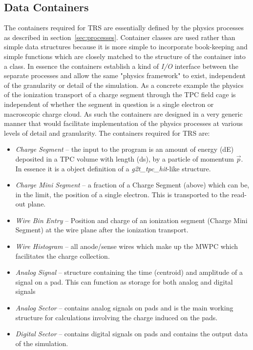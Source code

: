 \documentclass[twoside]{article}
\newcommand{\name}[1]{\textsf{#1}}%
\begin{document}
\subsection{Data Containers}
\label{sec:dataContainers}

The containers required for \name{TRS} are essentially defined by 
the physics processes as described in section~\ref{sec:processes}.  Container
classes are used rather than simple data structures because it is
more simple to incorporate book-keeping and simple functions which
are closely matched to the structure of the container into a class.  
In essence the
containers establish a kind of {\em I/O} interface between the separate
processes and allow the same "physics framework" to exist, independent of
the granularity or detail of the simulation.  As a concrete example the
physics of the ionization transport of a charge segment through the
TPC field cage is independent of whether the segment in question is
a single electron or macroscopic charge cloud.  As such the containers
are designed in a very generic manner that would facilitate implementation
of the physics processes at various levels of detail and granularity.
The containers required for \name{TRS} are:

\begin{itemize}
   \item {\em Charge Segment} -- the input to the program is an amount of
     energy (dE) deposited in a TPC volume with length (ds), by a
     particle of momentum $\vec{p}$.  In essence it is a object definition
     of a {\em g2t\_tpc\_hit}-like structure.
   \item {\em Charge Mini Segment} -- a fraction of a Charge Segment (above) 
     which can be, in the limit, the position of a single electron.
     This is transported to the read-out plane.
   \item {\em Wire Bin Entry} -- Position and charge of an ionization segment 
     (Charge Mini Segment)
     at the wire plane after the ionization transport.
   \item {\em Wire Histogram} -- all anode/sense wires which make
     up the MWPC which facilitates the charge collection.
   \item {\em Analog Signal} -- structure containing the time (centroid) and 
     amplitude of a signal on a pad.  This can function as storage 
     for both analog and digital signals
   \item {\em Analog Sector} -- contains analog signals on pads and is the
     main working structure for calculations involving the charge induced
     on the pads.
   \item {\em Digital Sector} -- contains digital signals on pads and contains the
     output data of the simulation.     
\end{itemize}
\end{document}
